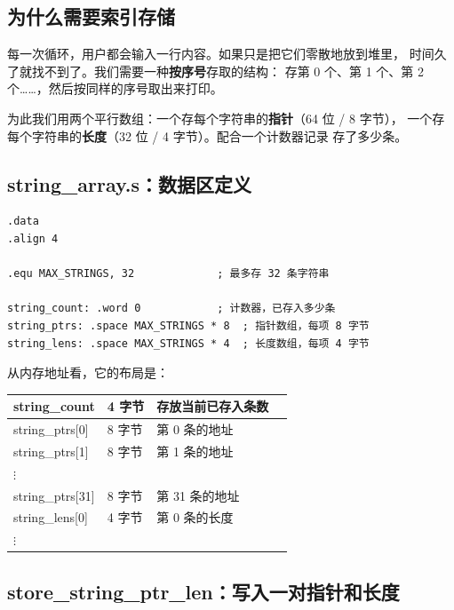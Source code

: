 \subsection{为什么需要索引存储}

每一次循环，用户都会输入一行内容。如果只是把它们零散地放到堆里，
时间久了就找不到了。我们需要一种\textbf{按序号}存取的结构：
存第 0 个、第 1 个、第 2 个……，然后按同样的序号取出来打印。

为此我们用两个平行数组：一个存每个字符串的\textbf{指针}（64 位 / 8 字节），
一个存每个字符串的\textbf{长度}（32 位 / 4 字节）。配合一个计数器记录
存了多少条。

\subsection{string\_array.s：数据区定义}

\begin{lstlisting}[style=asm,caption=string\_array.s — 数据区定义]
.data
.align 4

.equ MAX_STRINGS, 32             ; 最多存 32 条字符串

string_count: .word 0            ; 计数器，已存入多少条
string_ptrs: .space MAX_STRINGS * 8  ; 指针数组，每项 8 字节
string_lens: .space MAX_STRINGS * 4  ; 长度数组，每项 4 字节
\end{lstlisting}

从内存地址看，它的布局是：

\begin{center}
\begin{tabular}{|l|l|l|l|}
\hline
string\_count & 4 字节 & 存放当前已存入条数 & \\
\hline
string\_ptrs[0] & 8 字节 & 第 0 条的地址 & \\
\hline
string\_ptrs[1] & 8 字节 & 第 1 条的地址 & \\
\hline
\(\vdots\) & & & \\
\hline
string\_ptrs[31] & 8 字节 & 第 31 条的地址 & \\
\hline
string\_lens[0] & 4 字节 & 第 0 条的长度 & \\
\hline
\(\vdots\) & & & \\
\hline
\end{tabular}
\end{center}

\subsection{store\_string\_ptr\_len：写入一对指针和长度}

